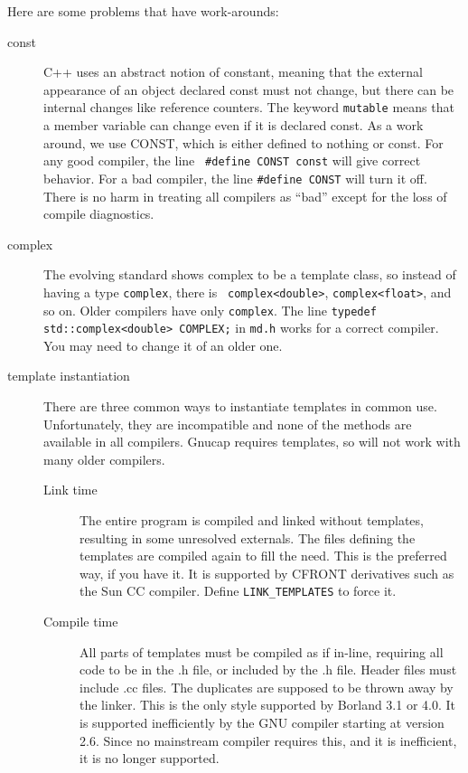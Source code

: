 Here are some problems that have work-arounds:

\begin{description}

\item[const] C++ uses an abstract notion of constant, meaning that
the external appearance of an object declared const must not change,
but there can be internal changes like reference counters.  The
keyword {\tt mutable} means that a member variable can change even if it
is declared const.  As a work around, we use CONST, which is either
defined to nothing or const.  For any good compiler, the line {\tt
\#define CONST const} will give correct behavior.  For a bad compiler,
the line {\tt \#define CONST} will turn it off.  There is no harm in
treating all compilers as ``bad'' except for the loss of compile
diagnostics.

\item[complex] The evolving standard shows complex to be a template
class, so instead of having a type {\tt complex}, there is {\tt
complex<double>}, {\tt complex<float>}, and so on.  Older compilers
have only {\tt complex}.  The line {\tt typedef std::complex<double>
COMPLEX;} in {\tt md.h} works for a correct compiler.  You may need to
change it of an older one.

\item[template instantiation] There are three common ways to
instantiate templates in common use.  Unfortunately, they are
incompatible and none of the methods are available in all compilers.
Gnucap requires templates, so will not work with many older compilers.

\begin{description}

\item[Link time] The entire program is compiled and linked without
templates, resulting in some unresolved externals.  The files
defining the templates are compiled again to fill the need.  This
is the preferred way, if you have it.  It is supported by CFRONT
derivatives such as the Sun CC compiler.  Define {\tt LINK\_TEMPLATES} to
force it. 

\item[Compile time] All parts of templates must be compiled as if
in-line, requiring all code to be in the .h file, or included by the
.h file.  Header files must include .cc files.  The duplicates are
supposed to be thrown away by the linker.  This is the only style
supported by Borland 3.1 or 4.0.  It is supported inefficiently by the
GNU compiler starting at version 2.6.  Since no mainstream compiler requires this, and it is inefficient, it is no longer supported.


\end{description}
\end{description}
